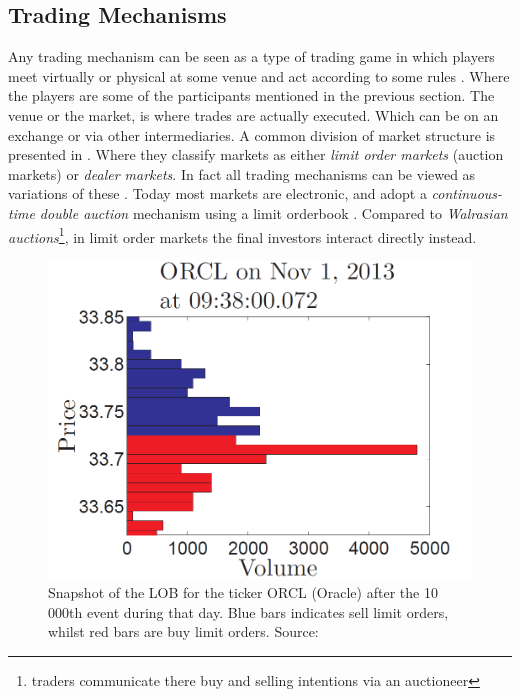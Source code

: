 \documentclass{kththesis}
\theoremstyle{definition}
\begin{document}
\subsection{Trading Mechanisms}
Any trading mechanism can be seen as a type of trading game in which players meet virtually or physical at some venue and act according to some rules \parencite{o1995market}. Where the players are some of the participants mentioned in the previous section. The venue or the market,  is where trades are actually executed. Which can be on an exchange or via other intermediaries. A common division of market structure is presented in \textcite{foucault2013market}. Where they classify markets as either \textit{limit order markets} (auction markets) or \textit{dealer markets}. In fact all trading mechanisms can be viewed as variations of these \parencite{foucault2013market}. Today most markets are electronic, and adopt a \textit{continuous-time double auction} mechanism using a limit orderbook \parencite{bouchaud2018trades}. Compared to \textit{Walrasian auctions}\footnote{traders communicate there buy and selling intentions via an auctioneer}, in limit order markets the final investors interact directly instead. 

\newpage

\begin{figure}[H]
    \centering
    \includegraphics[scale=.65]{LOBex.PNG}
    \caption{Snapshot of the LOB for the ticker ORCL (Oracle) after the 10 000th event during that day. Blue bars indicates sell limit orders, whilst red bars are buy limit orders. Source: \textcite{cartea2015algorithmic}}
    \label{fig:2}
\end{figure}
\end{document}
